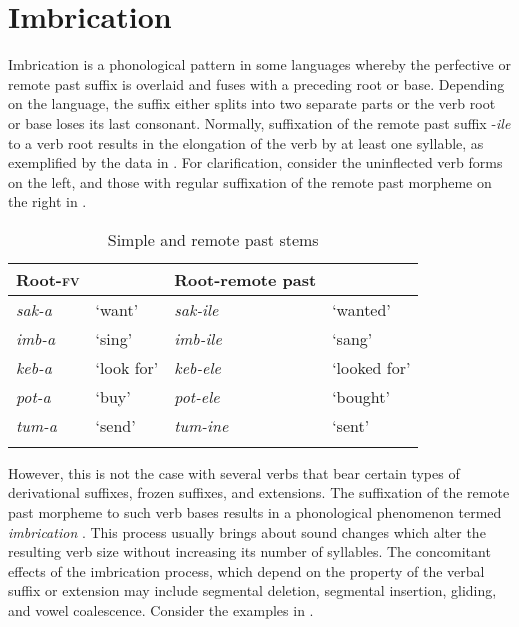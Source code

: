 \documentclass[output=paper]{langsci/langscibook}
\begin{document}
\section{Imbrication} \label{§4:imbrication.kawasha}

Imbrication is a phonological pattern in some  languages whereby the perfective or remote past suffix is overlaid and fuses with a preceding root or base. Depending on the language, the suffix either splits into two separate parts or the verb root or base loses its last consonant. Normally, suffixation of the remote past suffix -\textit{ile} to a verb root results in the elongation of the verb by at least one syllable, as exemplified by the data in . For clarification, consider the uninflected verb forms on the left, and those with regular suffixation of the remote past morpheme on the right in . 

\begin{table}
\begin{tabularx}{.75\textwidth}{XXlX}
\lsptoprule
Root-\textsc{fv} &  & Root-remote past & \\
\midrule
\textit{sak-a} & `want' & \textit{sak-ile} & `wanted' \\
\textit{imb-a} & `sing' & \textit{imb-ile} & `sang' \\
\textit{keb-a} & `look for' & \textit{keb-ele} & `looked for' \\
\textit{pot-a} & `buy' & \textit{pot-ele} & `bought' \\
\textit{tum-a} & `send' & \textit{tum-ine} & `sent' \\

\lspbottomrule
\end{tabularx}

\caption{Simple and remote past stems}
\label{tab:18.kawasha}

\end{table}

However, this is not the case with several verbs that bear certain types of derivational suffixes, frozen suffixes, and extensions. The suffixation of the remote past morpheme to such verb bases results in a phonological phenomenon termed \textit{imbrication} \citep{bastin1983}. This process usually brings about sound changes which alter the resulting verb size without increasing its number of syllables. The concomitant effects of the imbrication process, which depend on the property of the verbal suffix or extension may include segmental deletion, segmental insertion, gliding, and vowel coalescence. Consider the examples in . 
\end{document}
